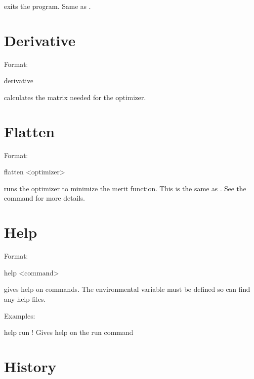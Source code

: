 \vskip 0.2in
 exits the program. Same as .

\section{Derivative}
\label{s:deriv}

Format:
\begin{example}
  derivative
\end{example}

\vskip 0.2in
 calculates the  matrix needed for the  optimizer.

\section{Flatten}
\label{s:flatten}

Format:
\begin{example}
  flatten <optimizer>
\end{example}

\vskip 0.2in
 runs the optimizer to minimize the merit function. This is the 
same as . See the  command for more details.

\section{Help}
\label{s:help}

Format:
\begin{example}
  help <command>
\end{example}

\vskip 0.2in 
 gives help on \tao commands. The environmental
variable  must be defined so \tao can find any help files.

Examples:
\begin{example}
  help run   ! Gives help on the run command
\end{example}

\section{History}
\label{s:history}

